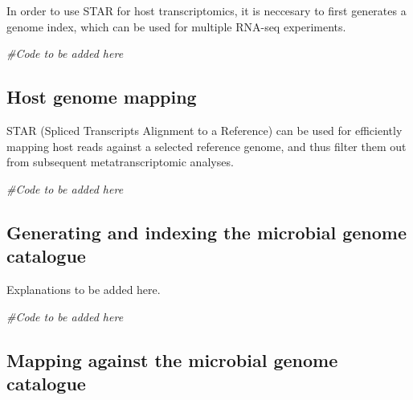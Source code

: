 \documentclass[
]{book}
\newenvironment{Shaded}{\begin{snugshade}}{\end{snugshade}}
\newcommand{\CommentTok}[1]{\textcolor[rgb]{0.56,0.35,0.01}{\textit{#1}}}
\begin{document}
In order to use STAR for host transcriptomics, it is neccesary to first generates a genome index, which can be used for multiple RNA-seq experiments.

\begin{Shaded}
\begin{Highlighting}[]
\CommentTok{\#Code to be added here}
\end{Highlighting}
\end{Shaded}

\hypertarget{host-genome-mapping}{%
\subsection*{Host genome mapping}\label{host-genome-mapping}}

STAR (Spliced Transcripts Alignment to a Reference) can be used for efficiently mapping host reads against a selected reference genome, and thus filter them out from subsequent metatranscriptomic analyses.

\begin{Shaded}
\begin{Highlighting}[]
\CommentTok{\#Code to be added here}
\end{Highlighting}
\end{Shaded}

\hypertarget{generating-and-indexing-the-microbial-genome-catalogue}{%
\subsection*{Generating and indexing the microbial genome catalogue}\label{generating-and-indexing-the-microbial-genome-catalogue}}

Explanations to be added here.

\begin{Shaded}
\begin{Highlighting}[]
\CommentTok{\#Code to be added here}
\end{Highlighting}
\end{Shaded}

\hypertarget{mapping-against-the-microbial-genome-catalogue}{%
\subsection*{Mapping against the microbial genome catalogue}\label{mapping-against-the-microbial-genome-catalogue}}
\end{document}
